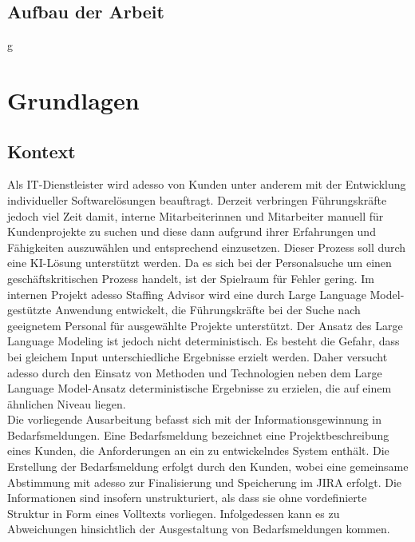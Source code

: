\section{Aufbau der Arbeit}
\newpage
g
\newpage
\chapter{Grundlagen}
\section{Kontext}
Als IT-Dienstleister wird adesso von Kunden unter anderem mit der Entwicklung individueller Softwarelösungen beauftragt. Derzeit verbringen Führungskräfte jedoch viel Zeit damit, interne Mitarbeiterinnen und Mitarbeiter manuell für Kundenprojekte zu suchen und diese dann aufgrund ihrer Erfahrungen und Fähigkeiten auszuwählen und entsprechend einzusetzen. Dieser Prozess soll durch eine KI-Lösung unterstützt werden. Da es sich bei der Personalsuche um einen geschäftskritischen Prozess handelt, ist der Spielraum für Fehler gering. Im internen Projekt adesso Staffing Advisor wird eine durch Large Language Model-gestützte Anwendung entwickelt, die Führungskräfte bei der Suche nach geeignetem Personal für ausgewählte Projekte unterstützt. Der Ansatz des Large Language Modeling ist jedoch nicht deterministisch. Es besteht die Gefahr, dass bei gleichem Input unterschiedliche Ergebnisse erzielt werden. Daher versucht adesso durch den Einsatz von Methoden und Technologien neben dem Large Language Model-Ansatz deterministische Ergebnisse zu erzielen, die auf einem ähnlichen Niveau liegen.\\

Die vorliegende Ausarbeitung befasst sich mit der Informationsgewinnung in Bedarfsmeldungen. Eine Bedarfsmeldung bezeichnet eine Projektbeschreibung eines Kunden, die Anforderungen an ein zu entwickelndes System enthält. Die Erstellung der Bedarfsmeldung erfolgt durch den Kunden, wobei eine gemeinsame Abstimmung mit adesso zur Finalisierung und Speicherung im JIRA erfolgt. Die Informationen sind insofern unstrukturiert, als dass sie ohne vordefinierte Struktur in Form eines Volltexts vorliegen. Infolgedessen kann es zu Abweichungen hinsichtlich der Ausgestaltung von Bedarfsmeldungen kommen.\\

